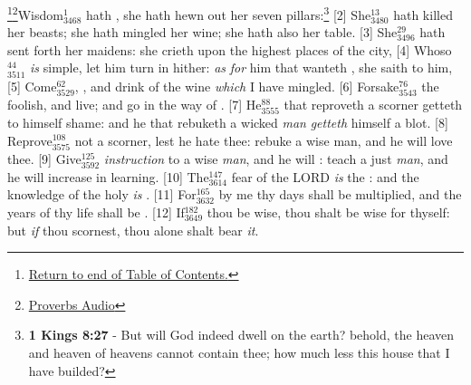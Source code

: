 \footnote{\textcolor[cmyk]{0.99998,1,0,0}{\hyperlink{TOC}{Return to end of Table of Contents.}}}\footnote{\href{https://audiobible.com/bible/proverbs_9.html}{\textcolor[cmyk]{0.99998,1,0,0}{Proverbs Audio}}}\textcolor[cmyk]{0.99998,1,0,0}{Wisdom\textcolor{jungle}{$_{3468}^{1}$} hath , she hath hewn out her seven pillars:}\footnote{\textbf{1 Kings 8:27} - But will God indeed dwell on the earth? behold, the heaven and heaven of heavens cannot contain thee; how much less this house that I have builded?} 
[2] \textcolor[cmyk]{0.99998,1,0,0}{She\textcolor{jungle}{$_{3480}^{13}$} hath killed her beasts; she hath mingled her wine; she hath also  her table.}
[3] \textcolor[cmyk]{0.99998,1,0,0}{She\textcolor{jungle}{$_{3496}^{29}$} hath sent forth her maidens: she crieth upon the highest places of the city,}
[4] \textcolor[cmyk]{0.99998,1,0,0}{Whoso\textcolor{jungle}{$_{3511}^{44}$} \emph{is} simple, let him turn in hither: \emph{as} \emph{for} him that wanteth , she saith to him,}
[5] \textcolor[cmyk]{0.99998,1,0,0}{Come\textcolor{jungle}{$_{3529}^{62}$},  , and drink of the wine \emph{which} I have mingled.}
[6] \textcolor[cmyk]{0.99998,1,0,0}{Forsake\textcolor{jungle}{$_{3543}^{76}$} the foolish, and live; and go in the way of .}
[7] \textcolor[cmyk]{0.99998,1,0,0}{He\textcolor{jungle}{$_{3555}^{88}$} that reproveth a scorner getteth to himself shame: and he that rebuketh a wicked \emph{man} \emph{getteth} himself a blot.}
[8] \textcolor[cmyk]{0.99998,1,0,0}{Reprove\textcolor{jungle}{$_{3575}^{108}$} not a scorner, lest he hate thee: rebuke a wise man, and he will love thee.}
[9] \textcolor[cmyk]{0.99998,1,0,0}{Give\textcolor{jungle}{$_{3592}^{125}$} \emph{instruction} to a wise \emph{man}, and he will : teach a just \emph{man}, and he will increase in learning.}
[10] \textcolor[cmyk]{0.99998,1,0,0}{The\textcolor{jungle}{$_{3614}^{147}$} fear of the LORD \emph{is} the : and the knowledge of the holy \emph{is} .}
[11] \textcolor[cmyk]{0.99998,1,0,0}{For\textcolor{jungle}{$_{3632}^{165}$} by me thy days shall be multiplied, and the years of thy life shall be .}
[12] \textcolor[cmyk]{0.99998,1,0,0}{If\textcolor{jungle}{$_{3649}^{182}$} thou be wise, thou shalt be wise for thyself: but \emph{if} thou scornest, thou alone shalt bear \emph{it}.}
